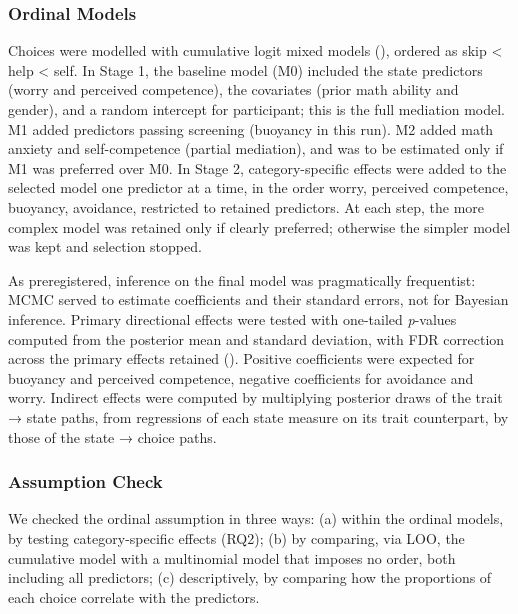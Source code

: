 \documentclass[
  man,
  floatsintext,
  longtable,
  nolmodern,
  notxfonts,
  notimes,
  colorlinks=true,linkcolor=blue,citecolor=blue,urlcolor=blue]{apa7}
\begin{document}
\subsubsection{Ordinal Models}\label{ordinal-models}

Choices were modelled with cumulative logit mixed models
(), ordered as skip
\textless{} help \textless{} self. In Stage 1, the baseline model (M0)
included the state predictors (worry and perceived competence), the
covariates (prior math ability and gender), and a random intercept for
participant; this is the full mediation model. M1 added predictors
passing screening (buoyancy in this run). M2 added math anxiety and
self-competence (partial mediation), and was to be estimated only if M1
was preferred over M0. In Stage 2, category-specific effects were added
to the selected model one predictor at a time, in the order worry,
perceived competence, buoyancy, avoidance, restricted to retained
predictors. At each step, the more complex model was retained only if
clearly preferred; otherwise the simpler model was kept and selection
stopped.

As preregistered, inference on the final model was pragmatically
frequentist: MCMC served to estimate coefficients and their standard
errors, not for Bayesian inference. Primary directional effects were
tested with one-tailed \emph{p}-values computed from the posterior mean
and standard deviation, with FDR correction across the primary effects
retained ().
Positive coefficients were expected for buoyancy and perceived
competence, negative coefficients for avoidance and worry. Indirect
effects were computed by multiplying posterior draws of the trait →
state paths, from regressions of each state measure on its trait
counterpart, by those of the state → choice paths.

\subsubsection{Assumption Check}\label{assumption-check}

We checked the ordinal assumption in three ways: (a) within the ordinal
models, by testing category-specific effects (RQ2); (b) by comparing,
via LOO, the cumulative model with a multinomial model that imposes no
order, both including all predictors; (c) descriptively, by comparing
how the proportions of each choice correlate with the predictors.
\end{document}
